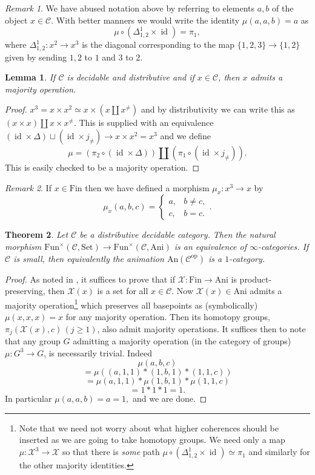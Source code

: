 \documentclass[11pt, oneside]{amsart}       %
\newtheorem{theorem}{Theorem}[section]
\newtheorem{lemma}[theorem]{Lemma}
\theoremstyle{remark}
\newtheorem*{remark}{Remark}
\renewcommand{\geq}{\geqslant}
\newcommand{\XX}{\mathcal{X}}
\newcommand{\cC}{\mathscr{C}}
\newcommand{\idt}{\operatorname{id}}
\newcommand{\ani}{\mathrm{Ani}}
\newcommand{\fnt}{\mathrm{Fin}}
\begin{document}
\begin{remark} We have abused notation above by referring to elements $a,b$ of the object $x\in\cC$. With better manners we would write the identity $\mu(a,a,b)=a$ as $$\mu\circ (\Delta^1_{1,2}\times\idt)=\pi_1,$$ where $\Delta^1_{1,2}:x^2\to x^3$ is the diagonal corresponding to the map $\{1,2,3\}\to \{1,2\}$ given by sending $1,2$ to $1$ and $3$ to $2$.  \end{remark}

\begin{lemma} If $\cC$ is decidable and distributive and if $x \in\cC$, then $x$ admits a majority operation. \end{lemma}

\begin{proof} $x^3=x\times x^2\simeq x\times (x\amalg x^{\neq})$ and by distributivity we can write this as $(x\times x)\amalg x\times x^{\neq}$. This is supplied with an equivalence $(\idt\times\Delta)\sqcup(\idt\times j_{\neq})\to x\times x^2=x^3$ and we define $$\mu=(\pi_2\circ (\idt\times\Delta))\amalg(\pi_1\circ(\idt\times j_{\neq})).$$ This is easily checked to be a majority operation.\end{proof}

\begin{remark} If $x\in \fnt$ then we have defined a morphism $\mu_x:x^3\to x$ by $$\mu_x(a,b,c)=\begin{cases}a,&b\neq c,\\c,&b=c.\end{cases}.$$\end{remark}



\begin{theorem} Let $\cC$ be a distributive decidable category. Then the natural morphism $\mathrm{Fun}^\times(\cC,\mathrm{Set})\to\mathrm{Fun}^\times(\cC,\ani)$ is an equivalence of $\infty$-categories. If $\cC$ is small, then equivalently the animation $\mathrm{An}(\cC^{\mathrm{op}})$ is a $1$-category.\end{theorem}

\begin{proof} As noted in \cite{Ant}, it suffices to prove that if $\XX:\fnt\to\ani$ is product-preserving, then $\XX(x)$ is a set for all $x\in\cC$. Now $\XX(x)\in\ani$ admits a majority operation\footnote{Note that we need not worry about what higher coherences should be inserted as we are going to take homotopy groups. We need only a map $\mu:\XX^3\to \XX$ so that there is \emph{some} path $\mu\circ(\Delta^1_{1,2}\times\idt)\simeq \pi_1$ and similarly for the other majority identities.} which preserves all basepoints as (symbolically) $\mu(x,x,x)=x$ for any majority operation. Then its homotopy groups, $\pi_j(\XX(x),c)\,(j\geq 1)$, also admit majority operations. It suffices then to note that any group $G$ admitting a majority operation (in the category of groups) $\mu:G^3\to G$, is necessarily trivial. Indeed  $$\mu(a,b,c)$$ $$=\mu((a,1,1)*(1,b,1)*(1,1,c))$$ $$=\mu(a,1,1)*\mu(1,b,1)*\mu(1,1,c)$$ $$=1*1*1=1.$$ In particular $\mu(a,a,b)=a=1,$ and we are done. \end{proof}
\end{document}
